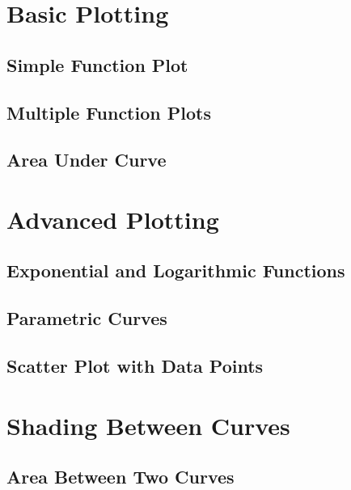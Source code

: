 \documentclass{beamer}
\begin{document}

\section{Basic Plotting}
\subsection{Simple Function Plot}

\subsection{Multiple Function Plots}

\subsection{Area Under Curve}



\section{Advanced Plotting}
\subsection{Exponential and Logarithmic Functions}

\subsection{Parametric Curves}

\subsection{Scatter Plot with Data Points}



\section{Shading Between Curves}
\subsection{Area Between Two Curves}

\end{document}
